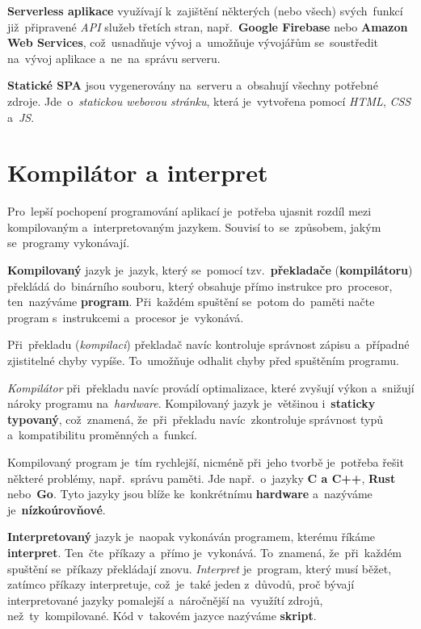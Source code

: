 \documentclass[11pt,a4paper]{report}
\let\oldacrshort\acrshort
\renewcommand{\acrshort}[1]{\emph{\normalsize\color[rgb]{0,0,0}\noindent\oldacrshort{#1}}}
\begin{document}
            \textbf{Serverless aplikace} využívají k~zajištění některých (nebo všech) svých~funkcí již~připravené \acrshort{API} služeb třetích stran, např.~\textbf{Google Firebase} nebo \textbf{Amazon Web Services}, což~usnadňuje vývoj a~umožňuje vývojářům se~soustředit na~vývoj aplikace a~ne~na~správu serveru.
            
            \textbf{Statické SPA} jsou vygenerovány na~serveru a~obsahují všechny potřebné zdroje. Jde~o~\emph{statickou webovou stránku}, která je~vytvořena pomocí \acrshort{HTML}, \acrshort{CSS} a~\acrshort{JS}.
        
        \section{Kompilátor a interpret}
            Pro~lepší pochopení programování aplikací je~potřeba ujasnit rozdíl mezi kompilovaným a~interpretovaným jazykem. Souvisí to~se~způsobem, jakým se~programy vykonávají.

            \textbf{Kompilovaný} jazyk je~jazyk, který se~pomocí tzv.~\textbf{překladače} (\textbf{kompilátoru}) překládá do~binárního souboru, který obsahuje přímo instrukce pro~procesor, ten~nazýváme \textbf{program}. Při~každém spuštění se~potom do~paměti načte program s~instrukcemi a~procesor je~vykonává.
            
            Při~překladu (\emph{kompilaci}) překladač navíc kontroluje správnost zápisu a~případné zjistitelné chyby vypíše. To~umožňuje odhalit chyby před spuštěním programu.
            
            \emph{Kompilátor} při~překladu navíc provádí optimalizace, které zvyšují výkon a~snižují nároky programu na~\emph{hardware}. Kompilovaný jazyk je~většinou i~\textbf{staticky typovaný}, což~znamená, že~při~překladu navíc~zkontroluje správnost typů a~kompatibilitu proměnných a~funkcí.
            
            Kompilovaný program je~tím rychlejší, nicméně při~jeho tvorbě je~potřeba řešit některé problémy, např.~správu paměti. Jde např.~o~jazyky \textbf{C a C++}, \textbf{Rust} nebo~\textbf{Go}. Tyto jazyky jsou blíže ke~konkrétnímu \textbf{hardware} a~nazýváme je~\textbf{nízkoúrovňové}.
            
            \textbf{Interpretovaný} jazyk je~naopak vykonáván programem, kterému říkáme \textbf{interpret}. Ten~čte~příkazy a~přímo je~vykonává. To~znamená, že~při~každém spuštění se~příkazy překládají znovu. \emph{Interpret} je~program, který musí běžet, zatímco příkazy interpretuje, což~je~také jeden z~důvodů, proč bývají interpretované jazyky pomalejší a~náročnější na~využítí zdrojů, než~ty~kompilované. Kód v~takovém jazyce nazýváme \textbf{skript}.
\end{document}

